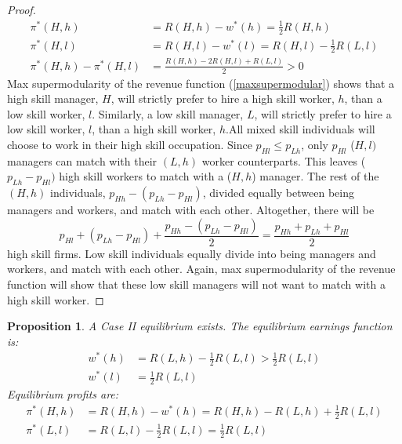 \documentclass[12 pt]{article}
\newtheorem{proposition}{Proposition} %
\begin{document}
\begin{proof}%
	\begin{align*}
		\pi^{\ast}(H,h)  & =R(H,h)-w^{\ast}(h)=\frac{1}{2}R(H,h)\\
		\pi^{\ast}(H,l)  & =R(H,l)-w^{\ast}(l)=R(H,l)-\frac{1}{2}R(L,l)\\
		\pi^{\ast}(H,h)-\pi^{\ast}(H,l)  & =\frac{R(H,h)-2R(H,l)+R(L,l)}{2}>0
	\end{align*}
	Max supermodularity of the revenue function (\ref{maxsupermodular}) shows that a high skill
	manager, $H$, will strictly prefer to hire a high skill worker, $h$, than a
	low skill worker, $l$. Similarly, a low skill manager, $L$, will strictly
	prefer to hire a low skill worker, $l$, than a high skill worker, $h$.All mixed skill individuals will choose to work in their high skill occupation. Since $p_{Hl}\leq p_{Lh}$, only $p_{Hl}$ ($H,l)$ managers can
	match with their $(L,h)$ worker counterparts. This leaves ($p_{Lh}-p_{Hl})$
	high skill workers to match with a ($H,h$) manager. The rest of the $(H,h)$
	individuals, $p_{Hh}-(p_{Lh}-p_{Hl})$, divided equally between being managers
	and workers, and match with each other. Altogether, there will be
	\[
	p_{Hl}+(p_{Lh}-p_{Hl})+\frac{p_{Hh}-(p_{Lh}-p_{Hl})}{2}=\frac{p_{Hh}%
		+p_{Lh}+p_{Hl}}{2}%
	\]
	high skill firms. Low skill individuals equally divide into being managers and workers, and
	match with each other. Again, max supermodularity of the revenue function will
	show that these low skill managers will not want to match with a high skill
	worker.
\end{proof}


\begin{proposition}
	\label{p2}\bigskip A Case II equilibrium exists. The equilibrium earnings
	function is:%
	\begin{align}
		w^{\ast}(h) &  =R(L,h)-\frac{1}{2}R(L,l)>\frac{1}{2}%
		R(L,l)\label{Case 2 wage function}\\
		w^{\ast}(l) &  =\frac{1}{2}R(L,l)\nonumber
	\end{align}
	Equilibrium profits are:%
	\begin{align}
		\pi^{\ast}(H,h) &  =R(H,h)-w^{\ast}(h)=R(H,h)-R(L,h)+\frac{1}{2}%
		R(L,l)\label{Case 2 profit function}\\
		\pi^{\ast}(L,l) &  =R(L,l)-\frac{1}{2}R(L,l)=\frac{1}{2}%
		R(L,l)\label{Ll profit}%
	\end{align}
	
\end{proposition}
\end{document}
